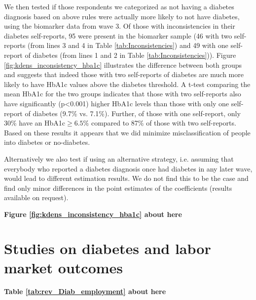 \documentclass[12pt,english]{article}
\providecommand{\DIFdelbegin}{} %
\begin{document}
\begin{appendix}
We then tested if those respondents we categorized as not having a diabetes diagnosis based on above rules were actually more likely to not have diabetes, using the biomarker data from wave 3. Of those with inconsistencies in their diabetes self-reports, 95 were present in the biomarker sample (46 with two self-reports (from lines 3 and 4 in Table \ref{tab:Inconsistencies}) and 49 with one self-report of diabetes (from lines 1 and 2 in Table \ref{tab:Inconsistencies})). Figure \ref{fig:kdens_inconsistency_hba1c} illustrates the difference between both groups and suggests that indeed those with two self-reports of diabetes are much more likely to have \ac{HbA1c} values above the diabetes threshold. A t-test comparing the mean \ac{HbA1c} for the two groups indicates that those with two self-reports also have significantly (p<0.001) higher \ac{HbA1c} levels than those with only one self-report of diabetes (9.7\% vs. 7.1\%). Further, of those with one self-report,  only 30\% have an \ac{HbA1c}$\geq6.5$\% compared to 87\% of those with two self-reports. Based on these results it appears that we did minimize misclassification of people into diabetes or no-diabetes. 

Alternatively we also test if using an alternative strategy, i.e. assuming that everybody who reported  a diabetes diagnosis once had diabetes in any later wave, would lead to different estimation results. We do not find this to be the case and find only minor differences in the point estimates of the coefficients (results available on request). 

\begin{center}
	\textbf{Figure \ref{fig:kdens_inconsistency_hba1c} about here}
\end{center}


\section{\label{sec:Appendix_B}Studies on diabetes and labor market outcomes}
\begin{center}
	\textbf{Table \ref{tab:rev_Diab_employment} about here}
\end{center}



\end{appendix}




\printbibliography




\DIFdelbegin %
\end{document}
